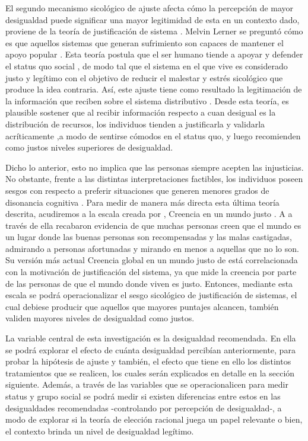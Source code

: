\documentclass[12pt]{article}
\begin{document}
El segundo mecanismo sicológico de ajuste afecta cómo la percepción de mayor desigualdad puede significar una mayor legitimidad de esta en un contexto dado, proviene de la teoría de justificación de sistema \cite{Trump2017}. Melvin Lerner se preguntó cómo es que aquellos sistemas que generan sufrimiento son capaces de mantener el apoyo popular \citep{Lerner1966} .  Esta teoría postula que el ser humano tiende a apoyar y defender el status quo social \citep{Blasi2006}, de modo tal que el sistema en el que vive es considerado justo y legítimo con el objetivo de reducir el malestar y estrés sicológico que  produce la idea contraria. Así, este ajuste tiene como resultado la legitimación de la información que reciben sobre el sistema distributivo \citep{Trump2017}. Desde esta teoría, es plausible sostener que al recibir información respecto a cuan desigual es la distribución de recursos, los individuos tienden a  justificarla y validarla acríticamente ,a modo de sentirse cómodos en el status quo, y luego recomienden como justos niveles superiores de desigualdad. 

Dicho lo anterior, esto no implica que las personas siempre acepten las injusticias. No obstante, frente a  las distintas interpretaciones factibles, los individuos poseen sesgos con respecto a preferir situaciones que generen menores grados de disonancia cognitiva \citep{Trump2017}. Para medir de manera más directa esta última teoría descrita, acudiremos a la escala creada por \cite{Rubin1975}, Creencia en un mundo justo . A a través de ella recabaron evidencia de que muchas personas creen que el mundo es un lugar donde las buenas personas son recompensadas y las malas castigadas, admirando a personas afortunadas y mirando en menos a aquellas que no lo son. Su versión más actual Creencia global en un mundo justo de \cite{Lipkus1991} está correlacionada con la motivación de justificación del sistema, ya que mide la creencia por parte de las personas de que el mundo donde viven es justo. Entonces, mediante esta escala se podrá operacionalizar el sesgo sicológico de justificación de sistemas, el cual debiese producir que aquellos que mayores puntajes alcancen, también validen mayores niveles de desigualdad como justos.   

La variable central de esta investigación es la desigualdad recomendada. En ella se podrá explorar el efecto de cuánta desigualdad percibían anteriormente, para probar la hipótesis de ajuste y también, el efecto que tiene en ello los distintos tratamientos que se realicen, los cuales serán explicados en detalle en la sección siguiente. Además, a través de las variables que se operacionalicen para medir status y grupo social se podrá medir si existen diferencias entre estos en las desigualdades recomendadas -controlando por percepción de desigualdad-, a modo de explorar si la teoría de elección racional juega un papel relevante o bien, el contexto brinda un nivel de desigualdad legítimo. 
\end{document}
